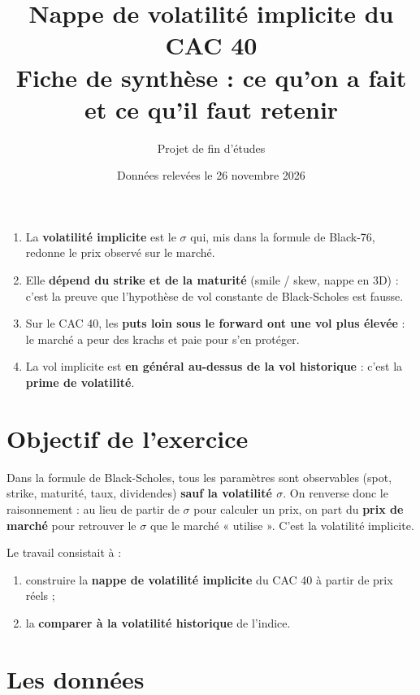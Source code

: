 \documentclass[11pt,a4paper]{article}
\title{\textbf{Nappe de volatilité implicite du CAC 40}\\[4pt]
\large Fiche de synthèse : ce qu'on a fait et ce qu'il faut retenir}
\author{Projet de fin d'études}
\date{Données relevées le 26 novembre 2026}
\begin{document}
\maketitle

\begin{aretenir}
\begin{enumerate}[leftmargin=*]
  \item La \textbf{volatilité implicite} est le $\sigma$ qui, mis dans la formule de Black-76,
        redonne le prix observé sur le marché.
  \item Elle \textbf{dépend du strike et de la maturité} (smile / skew, nappe en 3D) :
        c'est la preuve que l'hypothèse de vol constante de Black-Scholes est fausse.
  \item Sur le CAC 40, les \textbf{puts loin sous le forward ont une vol plus élevée} :
        le marché a peur des krachs et paie pour s'en protéger.
  \item La vol implicite est \textbf{en général au-dessus de la vol historique} :
        c'est la \textbf{prime de volatilité}.
\end{enumerate}
\end{aretenir}

\tableofcontents

\section{Objectif de l'exercice}

Dans la formule de Black-Scholes, tous les paramètres sont observables (spot, strike,
maturité, taux, dividendes) \textbf{sauf la volatilité $\sigma$}. On renverse donc le
raisonnement : au lieu de partir de $\sigma$ pour calculer un prix, on part du \textbf{prix
de marché} pour retrouver le $\sigma$ que le marché « utilise ». C'est la volatilité implicite.

Le travail consistait à :
\begin{enumerate}[leftmargin=*]
  \item construire la \textbf{nappe de volatilité implicite} du CAC 40 à partir de prix réels ;
  \item la \textbf{comparer à la volatilité historique} de l'indice.
\end{enumerate}

\section{Les données}
\end{document}
